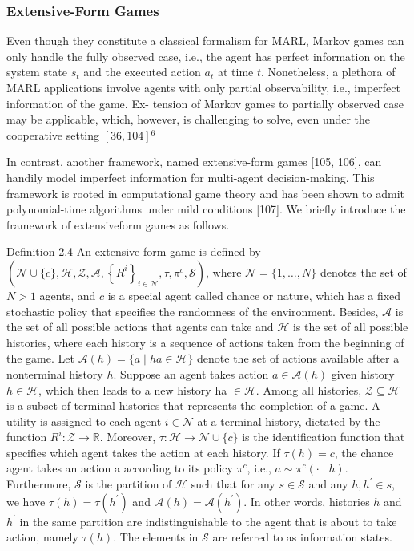 \documentclass[10pt]{article}
\begin{document}
\subsubsection{Extensive-Form Games}
Even though they constitute a classical formalism for MARL, Markov games can only handle the fully observed case, i.e., the agent has perfect information on the system state $s_{t}$ and the executed action $a_{t}$ at time $t$. Nonetheless, a plethora of MARL applications involve agents with only partial observability, i.e., imperfect information of the game. Ex- tension of Markov games to partially observed case may be applicable, which, however, is challenging to solve, even under the cooperative setting $[36,104]{ }^{6}$

In contrast, another framework, named extensive-form games [105, 106], can handily model imperfect information for multi-agent decision-making. This framework is rooted in computational game theory and has been shown to admit polynomial-time algorithms under mild conditions [107]. We briefly introduce the framework of extensiveform games as follows.

Definition 2.4 An extensive-form game is defined by $\left(\mathcal{N} \cup\{c\}, \mathcal{H}, \mathcal{Z}, \mathcal{A},\left\{R^{i}\right\}_{i \in \mathcal{N}}, \tau, \pi^{c}, \mathcal{S}\right)$, where $\mathcal{N}=\{1, \ldots, N\}$ denotes the set of $N>1$ agents, and $c$ is a special agent called chance or nature, which has a fixed stochastic policy that specifies the randomness of the environment. Besides, $\mathcal{A}$ is the set of all possible actions that agents can take and $\mathcal{H}$ is the set of all possible histories, where each history is a sequence of actions taken from the beginning of the game. Let $\mathcal{A}(h)=\{a \mid h a \in \mathcal{H}\}$ denote the set of actions available after a nonterminal history $h$. Suppose an agent takes action $a \in \mathcal{A}(h)$ given history $h \in \mathcal{H}$, which then leads to a new history ha $\in \mathcal{H}$. Among all histories, $\mathcal{Z} \subseteq \mathcal{H}$ is a subset of terminal histories that represents the completion of a game. A utility is assigned to each agent $i \in \mathcal{N}$ at a terminal history, dictated by the function $R^{i}: \mathcal{Z} \rightarrow \mathbb{R}$. Moreover, $\tau: \mathcal{H} \rightarrow \mathcal{N} \cup\{c\}$ is the identification function that specifies which agent takes the action at each history. If $\tau(h)=c$, the chance agent takes an action a according to its policy $\pi^{c}$, i.e., $a \sim \pi^{c}(\cdot \mid h)$. Furthermore, $\mathcal{S}$ is the partition of $\mathcal{H}$ such that for any $s \in \mathcal{S}$ and any $h, h^{\prime} \in s$, we have $\tau(h)=\tau\left(h^{\prime}\right)$ and $\mathcal{A}(h)=\mathcal{A}\left(h^{\prime}\right)$. In other words, histories $h$ and $h^{\prime}$ in the same partition are indistinguishable to the agent that is about to take action, namely $\tau(h)$. The elements in $\mathcal{S}$ are referred to as information states.
\end{document}
